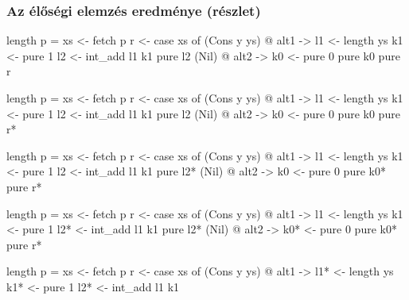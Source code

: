 \documentclass[bigger]{beamer}
\begin{document}
\begin{frame}[fragile]
	\frametitle{Az élőségi elemzés eredménye (részlet)}
	
	\begin{center}
		\begin{minipage}{0.50\textwidth}
			\begin{minipage}{0.50\textwidth}
			\begin{overprint}
				\begin{haskellcode}
				length p =
				  xs <- fetch p
				  r <- case xs of
				    (Cons y ys) @ alt1 ->
				      l1 <- length ys
				      k1 <- pure 1
				      l2 <- int_add l1 k1
				      pure l2
				    (Nil) @ alt2 ->
				      k0 <- pure 0
				      pure k0
				  pure r
				\end{haskellcode}
				\begin{haskellcode}
					length p =
					  xs <- fetch p
					  r <- case xs of
					    (Cons y ys) @ alt1 ->
					       l1 <- length ys
					       k1 <- pure 1
					       l2 <- int_add l1 k1
					       pure l2
					     (Nil) @ alt2 ->
					       k0 <- pure 0
					       pure k0
					  pure r*
				\end{haskellcode}
				\begin{haskellcode}
					length p =
					  xs <- fetch p
					  r <- case xs of
					    (Cons y ys) @ alt1 ->
					      l1 <- length ys
					      k1 <- pure 1
					      l2 <- int_add l1 k1
					      pure l2*
					    (Nil) @ alt2 ->
					      k0 <- pure 0
					      pure k0*
					  pure r*
			    \end{haskellcode}
                \begin{haskellcode}
                length p =
                  xs <- fetch p
                  r <- case xs of
                    (Cons y ys) @ alt1 ->
                      l1 <- length ys
                      k1 <- pure 1
                      l2* <- int_add l1 k1
                      pure l2*
                    (Nil) @ alt2 ->
                      k0* <- pure 0
                      pure k0*
                  pure r*
                \end{haskellcode}
                \begin{haskellcode}
                   length p =
                     xs <- fetch p
                     r <- case xs of
                       (Cons y ys) @ alt1 ->
                         l1* <- length ys
                         k1* <- pure 1
                         l2* <- int_add l1 k1

\end{haskellcode}
\end{overprint}
\end{minipage}
\end{minipage}
\end{center}
\end{frame}
\end{document}
